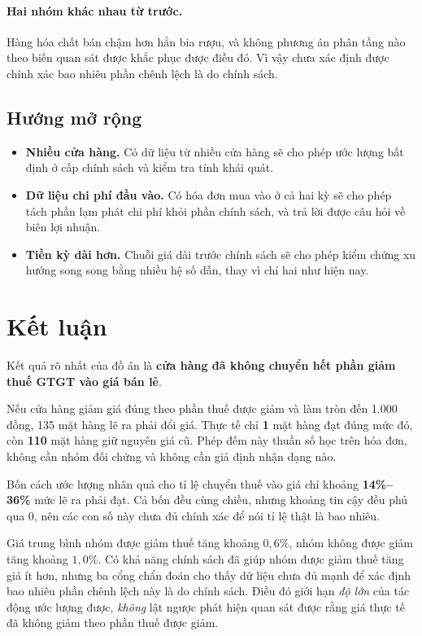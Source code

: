 \documentclass[11pt]{article}
\begin{document}
\paragraph{Hai nhóm khác nhau từ trước.} Hàng hóa chất bán chậm hơn hẳn bia rượu, và không phương án
phân tầng nào theo biến quan sát được khắc phục được điều đó. Vì vậy chưa xác định được chính xác
bao nhiêu phần chênh lệch là do chính sách.

\subsection{Hướng mở rộng}

\begin{itemize}
  \item \textbf{Nhiều cửa hàng.} Có dữ liệu từ nhiều cửa hàng sẽ cho phép ước lượng bất định ở cấp
  chính sách và kiểm tra tính khái quát.
  \item \textbf{Dữ liệu chi phí đầu vào.} Có hóa đơn mua vào ở cả hai kỳ sẽ cho phép tách phần lạm
  phát chi phí khỏi phần chính sách, và trả lời được câu hỏi về biên lợi nhuận.
  \item \textbf{Tiền kỳ dài hơn.} Chuỗi giá dài trước chính sách sẽ cho phép kiểm chứng xu hướng
  song song bằng nhiều hệ số dẫn, thay vì chỉ hai như hiện nay.
\end{itemize}

\section{Kết luận}

Kết quả rõ nhất của đồ án là \textbf{cửa hàng đã không chuyển hết phần giảm thuế GTGT vào giá bán
lẻ}.

Nếu cửa hàng giảm giá đúng theo phần thuế được giảm và làm tròn đến 1.000 đồng, 135 mặt hàng lẽ ra
phải đổi giá. Thực tế chỉ \textbf{1} mặt hàng đạt đúng mức đó, còn \textbf{110} mặt hàng giữ nguyên
giá cũ. Phép đếm này thuần số học trên hóa đơn, không cần nhóm đối chứng và không cần giả định nhận
dạng nào.

Bốn cách ước lượng nhân quả cho tỉ lệ chuyển thuế vào giá chỉ khoảng \textbf{14\%--36\%} mức lẽ ra
phải đạt. Cả bốn đều cùng chiều, nhưng khoảng tin cậy đều phủ qua 0, nên các con số này chưa đủ
chính xác để nói tỉ lệ thật là bao nhiêu.

Giá trung bình nhóm được giảm thuế tăng khoảng $0{,}6\%$, nhóm không được giảm tăng khoảng
$1{,}0\%$. Có khả năng chính sách đã giúp nhóm được giảm thuế tăng giá ít hơn, nhưng ba cổng chẩn
đoán cho thấy dữ liệu chưa đủ mạnh để xác định bao nhiêu phần chênh lệch này là do chính sách. Điều
đó giới hạn \emph{độ lớn} của tác động ước lượng được, \emph{không} lật ngược phát hiện quan sát
được rằng giá thực tế đã không giảm theo phần thuế được giảm.
\end{document}

